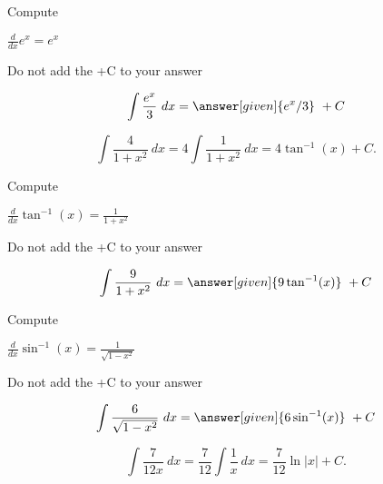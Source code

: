 \documentclass{ximera}
\begin{document}
\begin{problem} %
Compute

\begin{hint}
$\frac{d}{dx} e^x = e^x$
\end{hint}
\begin{hint}
\begin{center}
Do not add the +C to your answer
\end{center}
\end{hint}

\[
\int \frac{e^x}{3} \ dx =
\answer[given]{e^x /3} \ +  C
\]
\end{problem}


\begin{example} %
\[
\int \frac{4}{1+x^2} \ dx = 4 \int \frac{1}{1+x^2} \ dx = 4\tan^{-1}(x) +C.
\]
\end{example}



\begin{problem} %
Compute

\begin{hint}
$\frac{d}{dx} \tan^{-1}(x) = \frac{1}{1+x^2}$
\end{hint}
\begin{hint}
\begin{center}
Do not add the +C to your answer
\end{center}
\end{hint}

\[
\int \frac{9}{1+x^2} \ dx =
\answer[given]{9\tan^{-1}(x)} \ +  C
\]
\end{problem}

\begin{problem} %
Compute

\begin{hint}
$\frac{d}{dx} \sin^{-1}(x) = \frac{1}{\sqrt{1-x^2}}$
\end{hint}
\begin{hint}
\begin{center}
Do not add the +C to your answer
\end{center}
\end{hint}

\[
\int \frac{6}{\sqrt{1-x^2}} \ dx =
\answer[given]{6\sin^{-1}(x)} \ +  C
\]
\end{problem}


\begin{example} %
\[
\int \frac{7}{12x} \ dx = \frac{7}{12} \int \frac{1}{x} \ dx = \frac{7}{12} \ln|x| +C.
\]
\end{example}
\end{document}
